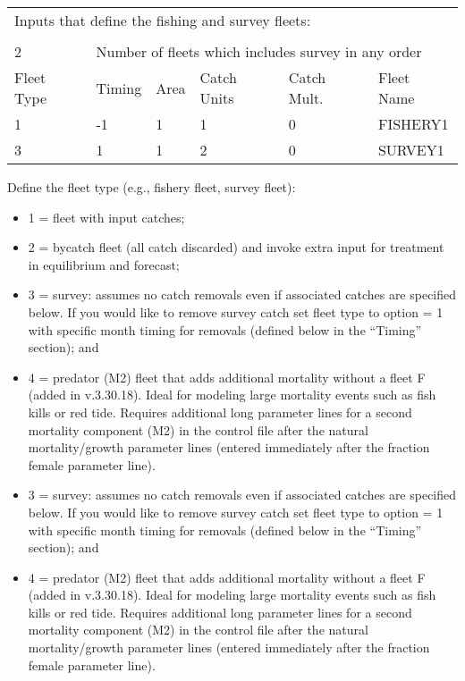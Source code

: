 \begin{center}
	\begin{tabular}{p{2cm} p{2cm} p{2cm} p{2cm} p{2cm} p{4cm}}
		\multicolumn{6}{l}{Inputs that define the fishing and survey fleets:} \\
	\begin{tabular}{p{2cm} p{2cm} p{2cm} p{2cm} p{2cm} p{4cm}}
		\multicolumn{6}{l}{Inputs that define the fishing and survey fleets:} \\
		\hline
		2 & \multicolumn{5}{l}{Number of fleets which includes survey in any order} \Tstrut\Bstrut\\

		\hline
		Fleet Type & Timing & Area & Catch Units & Catch Mult. & Fleet Name \Tstrut\Bstrut\\

		\hline
		1 & -1 & 1 & 1 & 0 & FISHERY1 \Tstrut\\
		3 &  1 & 1 & 2 & 0 & SURVEY1 \Bstrut\\
		\hline
		
	\end{tabular}
\end{center}

Define the fleet type (e.g., fishery fleet, survey fleet):
	  \begin{itemize}
	  	\item 1 = fleet with input catches;
	  	\item 2 = bycatch fleet (all catch discarded) and invoke extra input for treatment in equilibrium and forecast;
	  	\item 3 = survey: assumes no catch removals even if associated catches are specified below. If you would like to remove survey catch set fleet type to option = 1 with specific month timing for removals (defined below in the ``Timing'' section); and 
	  	\item 4 = predator (M2) fleet that adds additional mortality without a fleet F (added in v.3.30.18). Ideal for modeling large mortality events such as fish kills or red tide. Requires additional long parameter lines for a second mortality component (M2) in the control file after the natural mortality/growth parameter lines (entered immediately after the fraction female parameter line).
	  	\item 3 = survey: assumes no catch removals even if associated catches are specified below. If you would like to remove survey catch set fleet type to option = 1 with specific month timing for removals (defined below in the ``Timing'' section); and 
	  	\item 4 = predator (M2) fleet that adds additional mortality without a fleet F (added in v.3.30.18). Ideal for modeling large mortality events such as fish kills or red tide. Requires additional long parameter lines for a second mortality component (M2) in the control file after the natural mortality/growth parameter lines (entered immediately after the fraction female parameter line).
	  \end{itemize}

